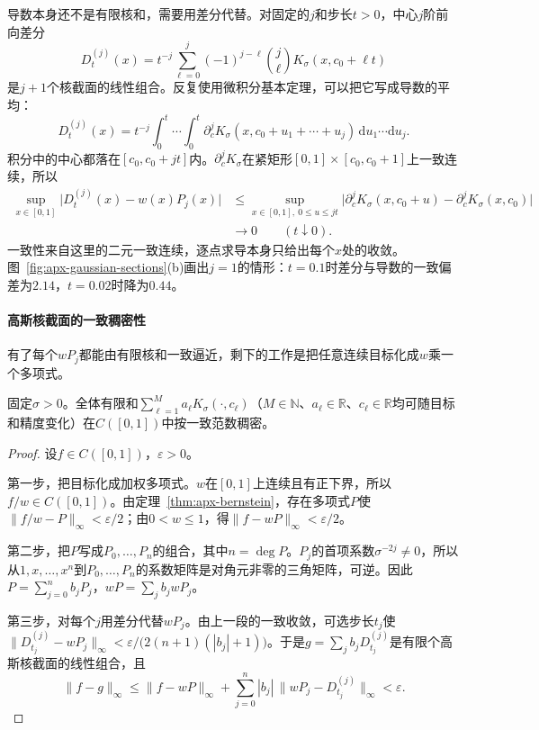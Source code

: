 导数本身还不是有限核和，需要用差分代替。对固定的$j$和步长$t>0$，中心$j$阶前向差分
\begin{equation}
  D_t^{(j)}(x)=t^{-j}\sum_{\ell=0}^{j}(-1)^{j-\ell}\binom j\ell K_\sigma(x,c_0+\ell t)
  \label{eq:apx-center-difference}
\end{equation}
是$j+1$个核截面的线性组合。反复使用微积分基本定理，可以把它写成导数的平均：
\[
  D_t^{(j)}(x)=t^{-j}\int_0^t\!\!\cdots\!\int_0^t\partial_c^jK_\sigma(x,c_0+u_1+\cdots+u_j)\,\mathrm du_1\cdots\mathrm du_j .
\]
积分中的中心都落在$[c_0,c_0+jt]$内。$\partial_c^jK_\sigma$在紧矩形$[0,1]\times[c_0,c_0+1]$上一致连续，所以
\[
  \begin{aligned}
  \sup_{x\in[0,1]}\bigl|D_t^{(j)}(x)-w(x)P_j(x)\bigr|
  &\le\sup_{x\in[0,1],\ 0\le u\le jt}\bigl|\partial_c^jK_\sigma(x,c_0+u)-\partial_c^jK_\sigma(x,c_0)\bigr|\\
  &\to0\qquad(t\downarrow0).
  \end{aligned}
\]
一致性来自这里的二元一致连续，逐点求导本身只给出每个$x$处的收敛。图~\ref{fig:apx-gaussian-sections}(b)画出$j=1$的情形：$t=0.1$时差分与导数的一致偏差为$2.14$，$t=0.02$时降为$0.44$。

\paragraph{高斯核截面的一致稠密性}

有了每个$wP_j$都能由有限核和一致逼近，剩下的工作是把任意连续目标化成$w$乘一个多项式。

\begin{theorem}[固定宽度高斯核截面的一致稠密性]
\label{thm:apx-gaussian-dense}
固定$\sigma>0$。全体有限和$\sum_{\ell=1}^{M}a_\ell K_\sigma(\cdot,c_\ell)$（$M\in\mathbb N$、$a_\ell\in\mathbb R$、$c_\ell\in\mathbb R$均可随目标和精度变化）在$C([0,1])$中按一致范数稠密。
\end{theorem}

\begin{proof}
设$f\in C([0,1])$，$\varepsilon>0$。

第一步，把目标化成加权多项式。$w$在$[0,1]$上连续且有正下界，所以$f/w\in C([0,1])$。由定理~\ref{thm:apx-bernstein}，存在多项式$P$使$\|f/w-P\|_\infty<\varepsilon/2$；由$0<w\le1$，得$\|f-wP\|_\infty<\varepsilon/2$。

第二步，把$P$写成$P_0,\ldots,P_n$的组合，其中$n=\deg P$。$P_j$的首项系数$\sigma^{-2j}\ne0$，所以从$1,x,\ldots,x^n$到$P_0,\ldots,P_n$的系数矩阵是对角元非零的三角矩阵，可逆。因此$P=\sum_{j=0}^nb_jP_j$，$wP=\sum_jb_jwP_j$。

第三步，对每个$j$用差分代替$wP_j$。由上一段的一致收敛，可选步长$t_j$使$\|D_{t_j}^{(j)}-wP_j\|_\infty<\varepsilon/\bigl(2(n+1)(|b_j|+1)\bigr)$。于是$g=\sum_jb_jD_{t_j}^{(j)}$是有限个高斯核截面的线性组合，且
\[
  \|f-g\|_\infty\le\|f-wP\|_\infty+\sum_{j=0}^n|b_j|\,\|wP_j-D_{t_j}^{(j)}\|_\infty<\varepsilon.
\]
\end{proof}

